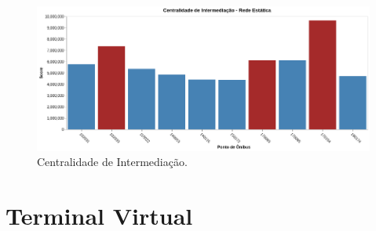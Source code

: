 \begin{figure}
\centering
\includegraphics[width=.9\textwidth]{Capitulo4/img/centralidade-intermediacao.png}
\caption{Centralidade de Intermediação.}
\label{fig:eventos-de-proximidade}
\end{figure}

\section{Terminal Virtual}






